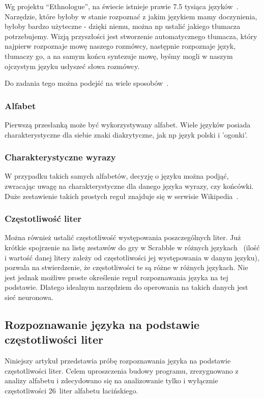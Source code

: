 \documentclass[journal]{IEEEtran}
\begin{document}
Wg projektu ``Ethnologue'', na świecie istnieje prawie 7.5 tysiąca języków~\cite{ethnologue}. Narzędzie,
które byłoby w stanie rozpoznać z jakim językiem mamy doczynienia, byłoby bardzo użyteczne - dzięki niemu,
można np ustalić jakiego tłumacza potrzebujemy. Wizją przyszłości jest stworzenie automatycznego tłumacza,
który najpierw rozpoznaje mowę naszego rozmówcy, następnie rozpoznaje język, tłumaczy go, a na samym końcu
syntezuje mowę, byśmy mogli w naszym ojczystym języku usłyszeć słowa rozmówcy.

Do zadania tego można podejść na wiele sposobów~\cite{smykowski:jak_google_rozpoznaje}.

\subsubsection{Alfabet}
Pierwszą przesłanką może być wykorzystywany alfabet. Wiele języków posiada charakterystyczne dla siebie znaki
diakrytyczne, jak np język polski i 'ogonki'.

\subsubsection{Charakterystyczne wyrazy}
W przypadku takich samych alfabetów, decyzję o języku można podjąć, zwracając uwagę na charakterystyczne dla
danego języka wyrazy, czy końcówki. Duże zestawienie takich prostych reguł znajduje się w serwisie Wikipedia~\cite{wiki:langs}.

\subsubsection{Częstotliwość liter}
Można również ustalić częstotliwość występowania poszczególnych liter. Już krótkie spojrzenie na listę zestawów do gry
w Scrabble w różnych językach~\cite{wiki:scrabble} (ilość i wartość danej litery zależy od częstotliwości jej występowania
w danym języku), pozwala na stwierdzenie, że częstotliwości te są różne w różnych językach. Nie jest jednak możliwe proste
określenie reguł rozpoznawania języka na tej podstawie. Dlatego idealnym narzędziem do operowania na takich danych jest
sieć neuronowa.


\subsection{Rozpoznawanie języka na podstawie częstotliwości liter}
Niniejszy artykuł przedstawia próbę rozpoznawania języka na podstawie częstotliwości liter. Celem uproszczenia budowy
programu, zrezygnowano z analizy alfabetu i zdecydowano się na analizowanie tylko i wyłącznie częstotliwości 26~liter
alfabetu łacińskiego.
\end{document}
